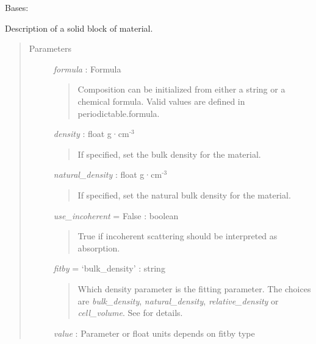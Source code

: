 \documentclass[letterpaper,10pt,english]{sphinxmanual}
\begin{document}
\begin{fulllineitems}
\label{api/material:refl1d.material.Material}
Bases: {\hyperref[api/material:refl1d.material.Scatterer]{}}

Description of a solid block of material.
\begin{quote}\begin{description}
\item[{Parameters }] \leavevmode
\emph{formula} : Formula
\begin{quote}

Composition can be initialized from either a string or a chemical
formula.  Valid values are defined in periodictable.formula.
\end{quote}

\emph{density} : float \textbar{} g·cm$^{\text{-3}}$
\begin{quote}

If specified, set the bulk density for the material.
\end{quote}

\emph{natural\_density} : float \textbar{} g·cm$^{\text{-3}}$
\begin{quote}

If specified, set the natural bulk density for the material.
\end{quote}

\emph{use\_incoherent} = False : boolean
\begin{quote}

True if incoherent scattering should be interpreted as absorption.
\end{quote}

\emph{fitby} = `bulk\_density' : string
\begin{quote}

Which density parameter is the fitting parameter.  The choices
are \emph{bulk\_density}, \emph{natural\_density}, \emph{relative\_density} or
\emph{cell\_volume}.  See {\hyperref[api/material:refl1d.material.Material.fitby]{}} for details.
\end{quote}

\emph{value} : Parameter or float \textbar{} units depends on fitby type
\begin{quote}


\end{quote}
\end{description}
\end{quote}
\end{fulllineitems}
\end{document}
